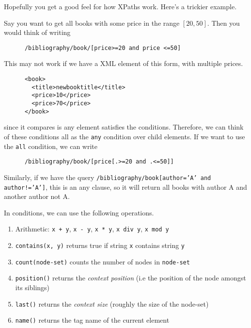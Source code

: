   Hopefully you get a good feel for how XPaths work. Here's a trickier example. 

  \begin{example}
    Say you want to get all books with some price in the range $[20, 50]$. Then you would think of writing 
    \begin{lstlisting}
      /bibliography/book/[price>=20 and price <=50]
    \end{lstlisting}
    This may not work if we have a XML element of this form, with multiple prices. 
    \begin{lstlisting}
      <book> 
        <title>newbooktitle</title>
        <price>10</price>
        <price>70</price> 
      </book>
    \end{lstlisting} 
    since it compares is any element satisfies the conditions. Therefore, we can think of these conditions all as the \texttt{any} condition over child elements. If we want to use the \texttt{all} condition, we can write 
    \begin{lstlisting}
      /bibliography/book/[price[.>=20 and .<=50]]
    \end{lstlisting}

    Similarly, if we have the query \texttt{/bibliography/book[author='A' and author!='A']}, this is an any clause, so it will return all books with author A and another author not A. 
  \end{example}

  \begin{definition} 
    In conditions, we can use the following operations. 
    \begin{enumerate}
      \item Arithmetic: \texttt{x + y}, \texttt{x - y}, \texttt{x * y}, \texttt{x div y}, \texttt{x mod y} 
      \item \texttt{contains(x, y)} returns true if string \texttt{x} contains string \texttt{y} 
      \item \texttt{count(node-set)} counts the number of nodes in \texttt{node-set} 
      \item \texttt{position()} returns the \textit{context position} (i.e the position of the node amongst its siblings) 
      \item \texttt{last()} returns the \textit{context size} (roughly the size of the node-set)
      \item \texttt{name()} returns the tag name of the current element
    \end{enumerate}
  \end{definition}


